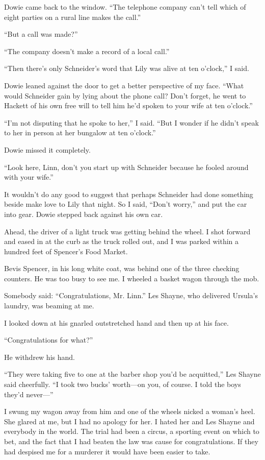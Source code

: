\documentclass{novel}
\begin{document}
Dowie came back to the window. “The telephone company can’t tell which of eight parties on a rural line makes the call.”

“But a call was made?”

“The company doesn’t make a record of a local call.”

“Then there’s only Schneider’s word that Lily was alive at ten o’clock,” I said.

Dowie leaned against the door to get a better perspective of my face. “What would Schneider gain by lying about the phone call? Don’t forget, he went to Hackett of his own free will to tell him he’d spoken to your wife at ten o’clock.”

“I’m not disputing that he spoke to her,” I said. “But I wonder if he didn’t speak to her in person at her bungalow at ten o’clock.”

Dowie missed it completely. 

“Look here, Linn, don’t you start up with Schneider because he fooled around with your wife.”

It wouldn’t do any good to suggest that perhaps Schneider had done something beside make love to Lily that night. So I said, “Don’t worry,” and put the car into gear. Dowie stepped back against his own car.

Ahead, the driver of a light truck was getting behind the wheel. I shot forward and eased in at the curb as the truck rolled out, and I was parked within a hundred feet of Spencer’s Food Market.

\scenestars

Bevis Spencer, in his long white coat, was behind one of the three checking counters. He was too busy to see me. I wheeled a basket wagon through the mob.

Somebody said: “Congratulations, Mr. Linn.” Les Shayne, who delivered Ursula’s laundry, was beaming at me.

I looked down at his gnarled outstretched hand and then up at his face.

“Congratulations for what?”

He withdrew his hand. 

“They were taking five to one at the barber shop you’d be acquitted,” Les Shayne said cheerfully. “I took two bucks’ worth—on you, of course. I told the boys they’d never—”

I swung my wagon away from him and one of the wheels nicked a woman’s heel. She glared at me, but I had no apology for her. I hated her and Les Shayne and everybody in the world. The trial had been a circus, a sporting event on which to bet, and the fact that I had beaten the law was cause for congratulations. If they had despised me for a murderer it would have been easier to take.
\end{document}
